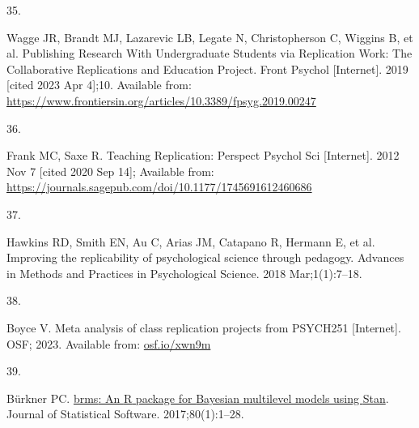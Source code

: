 \documentclass[
  english,
  a4paper,
]{article}
\newlength{\cslhangindent}
\newlength{\csllabelwidth}
\newlength{\cslentryspacingunit} %
\newenvironment{CSLReferences}[2] %
 {%
  \setlength{\parindent}{0pt}
  \ifodd #1
  \let\oldpar\par
  \def\par{\hangindent=\cslhangindent\oldpar}
  \fi
  \setlength{\parskip}{#2\cslentryspacingunit}
 }%
 {}
\newcommand{\CSLLeftMargin}[1]{\parbox[t]{\csllabelwidth}{#1}}
\newcommand{\CSLRightInline}[1]{\parbox[t]{\linewidth - \csllabelwidth}{#1}\break}
\begin{document}
\begin{CSLReferences}{0}{0}
\leavevmode{}%
\CSLLeftMargin{35. }%
\CSLRightInline{Wagge JR, Brandt MJ, Lazarevic LB, Legate N, Christopherson C, Wiggins B, et al. Publishing {Research With Undergraduate Students} via {Replication Work}: {The Collaborative Replications} and {Education Project}. Front Psychol {[}Internet{]}. 2019 {[}cited 2023 Apr 4{]};10. Available from: \url{https://www.frontiersin.org/articles/10.3389/fpsyg.2019.00247}}

\leavevmode{}%
\CSLLeftMargin{36. }%
\CSLRightInline{Frank MC, Saxe R. Teaching {Replication}: Perspect Psychol Sci {[}Internet{]}. 2012 Nov 7 {[}cited 2020 Sep 14{]}; Available from: \url{https://journals.sagepub.com/doi/10.1177/1745691612460686}}

\leavevmode{}%
\CSLLeftMargin{37. }%
\CSLRightInline{Hawkins RD, Smith EN, Au C, Arias JM, Catapano R, Hermann E, et al. Improving the replicability of psychological science through pedagogy. Advances in Methods and Practices in Psychological Science. 2018 Mar;1(1):7--18. }

\leavevmode{}%
\CSLLeftMargin{38. }%
\CSLRightInline{Boyce V. Meta analysis of class replication projects from PSYCH251 {[}Internet{]}. OSF; 2023. Available from: \href{https://osf.io/xwn9m}{osf.io/xwn9m}}

\leavevmode{}%
\CSLLeftMargin{39. }%
\CSLRightInline{Bürkner PC. \href{https://doi.org/10.18637/jss.v080.i01}{{brms}: An {R} package for {Bayesian} multilevel models using {Stan}}. Journal of Statistical Software. 2017;80(1):1--28. }

\end{CSLReferences}
\end{document}
